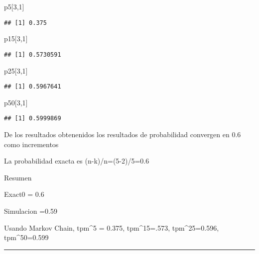 \documentclass[
]{article}
\newenvironment{Shaded}{\begin{snugshade}}{\end{snugshade}}
\newcommand{\DecValTok}[1]{\textcolor[rgb]{0.00,0.00,0.81}{#1}}
\newcommand{\NormalTok}[1]{#1}
\begin{document}
\begin{Shaded}
\begin{Highlighting}[]
\NormalTok{p5[}\DecValTok{3}\NormalTok{,}\DecValTok{1}\NormalTok{]}
\end{Highlighting}
\end{Shaded}

\begin{verbatim}
## [1] 0.375
\end{verbatim}

\begin{Shaded}
\begin{Highlighting}[]
\NormalTok{p15[}\DecValTok{3}\NormalTok{,}\DecValTok{1}\NormalTok{]}
\end{Highlighting}
\end{Shaded}

\begin{verbatim}
## [1] 0.5730591
\end{verbatim}

\begin{Shaded}
\begin{Highlighting}[]
\NormalTok{ p25[}\DecValTok{3}\NormalTok{,}\DecValTok{1}\NormalTok{]}
\end{Highlighting}
\end{Shaded}

\begin{verbatim}
## [1] 0.5967641
\end{verbatim}

\begin{Shaded}
\begin{Highlighting}[]
\NormalTok{p50[}\DecValTok{3}\NormalTok{,}\DecValTok{1}\NormalTok{]}
\end{Highlighting}
\end{Shaded}

\begin{verbatim}
## [1] 0.5999869
\end{verbatim}

De los resultados obtenenidos los resultados de probabilidad convergen
en 0.6 como incrementos

La probabilidad exacta es (n-k)/n=(5-2)/5=0.6

Resumen

Exact0 = 0.6

Simulacion =0.59

Usando Markov Chain, tpm\^{}5 = 0.375, tpm\^{}15=.573, tpm\^{}25=0.596,
tpm\^{}50=0.599

\begin{center}\rule{0.5\linewidth}{0.5pt}\end{center}
\end{document}
